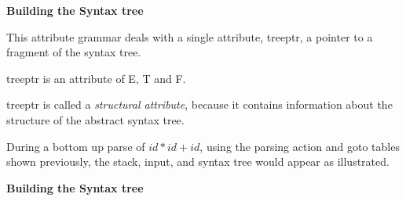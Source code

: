 %
%
\begin{slide}{}
{\bf Building the Syntax tree}

This attribute grammar deals with a single attribute,
treeptr, a pointer to a fragment of the syntax tree.

treeptr is an attribute of E, T and F.

treeptr is called a {\em structural attribute}, because
it contains information about the structure of the
abstract syntax tree.

During a bottom up parse of $id * id + id$, using the
parsing action and goto tables shown previously, the
stack, input, and syntax tree would appear as illustrated.
\end{slide}
%
%
\begin{slide}{}
{\bf Building the Syntax tree}

\vspace{3ex}

\end{slide}
